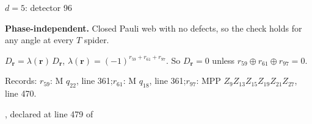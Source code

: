 \label{d5_det096}
{\Large $d=5$: detector 96}\par
\textbf{Phase-independent.} Closed Pauli web with no defects, so the check holds for any angle at every $T$ spider.
\begin{center}
\end{center}
\vspace{-1mm}
$D_{\boldsymbol r}=\lambda(\boldsymbol r)\,D_{\boldsymbol r}$, \quad $\lambda(\boldsymbol r)=(-1)^{r_{59}+r_{61}+r_{97}}$. \qquad So $D_{\boldsymbol r}=0$ unless $r_{59}\oplus r_{61}\oplus r_{97}=0$.
\par\smallskip\begin{minipage}{.98\linewidth}\small Records: $r_{59}$: M $q_{22}$, line 361;\quad $r_{61}$: M $q_{18}$, line 361;\quad $r_{97}$: MPP $Z_{9}Z_{13}Z_{15}Z_{19}Z_{21}Z_{27}$, line 470.\end{minipage}
\vfill
{\footnotesize\texttt{}, declared at line 479 of \texttt{}}
\newpage

